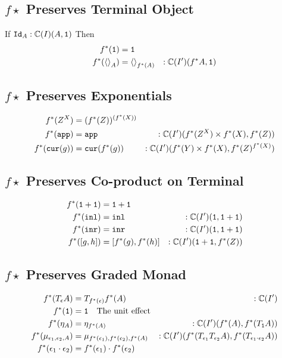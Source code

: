 \documentclass{report}
\begin{document}
\subsection{$f\star$ Preserves Terminal Object}
If $\texttt{Id}_{A}:\mathbb{C}(I)(A, \texttt{1})$
Then 
\begin{align*}
    f^*(\texttt{1}) & = \texttt{1} \\
    f^*(\left\langle\right\rangle_{A}) & = \left\langle\right\rangle_{f^*(A)}&:\mathbb{C}(I')(f^* A, \texttt{1})\\
\end{align*}

\subsection{$f\star$ Preserves Exponentials}
\begin{align*}
    f^*(Z^X) & = (f^*(Z))^{(f^*(X))}\\
     f^*(\texttt{app}) &= \texttt{app}&:\mathbb{C}(I')(f^*(Z^X)\times f^*(X), f^*(Z))\\
     f^*(\texttt{cur}(g)) &= \texttt{cur}(f^*(g))&:\mathbb{C}(I')(f^*(Y)\times f^*(X), f^*(Z)^{f^*(X)})
\end{align*}

\subsection{$f\star$ Preserves Co-product on Terminal}

\begin{align*}
    f^*(\texttt{1}+\texttt{1}) &= \texttt{1}+\texttt{1}\\
    f^*(\texttt{inl})  &= \texttt{inl}&:\mathbb{C}(I')(\texttt{1}, \texttt{1}+\texttt{1}) \\
    f^*(\texttt{inr}) &= \texttt{inr}&:\mathbb{C}(I')(\texttt{1}, \texttt{1}+\texttt{1}) \\
    f^*([g, h]) &= [f^*(g), f^*(h)]&:\mathbb{C}(I')(\texttt{1}+\texttt{1}, f^*(Z))
\end{align*}

\subsection{$f\star$ Preserves Graded Monad}
\begin{align*}
    f^*(T_{\epsilon}{A}) &= T_{f^*(\epsilon)}{f^*(A)}&:\mathbb{C}(I')\\
    f^*(\texttt{1}) &= \texttt{1} \quad\text{The unit effect}\\
    f^*(\eta_{A}) &= \eta_{f^*(A)}&:\mathbb{C}(I')(f^*(A), f^*(T_{\texttt{1}}{A}))\\
    f^*(\mu_{\epsilon_1, \epsilon_2, A}) &= \mu_{f^*(\epsilon_1), f^*(\epsilon_2), f^*(A)}&:\mathbb{C}(I')(f^*(T_{\epsilon_1}{T_{\epsilon_2}{A}}), f^*(T_{\epsilon_1\cdot\epsilon_2}{A}))\\
    f^*(\epsilon_1\cdot\epsilon_2) &= f^*(\epsilon_1)\cdot f^*(\epsilon_2)\\
\end{align*}
\end{document}
